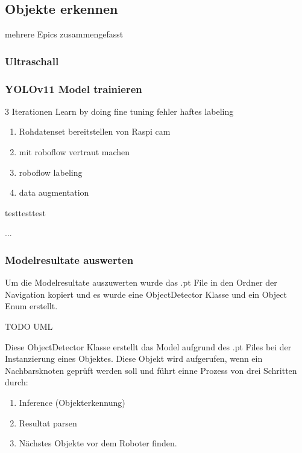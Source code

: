 
\subsection{Objekte erkennen}

mehrere Epics zusammengefasst 

\subsubsection{Ultraschall}

\subsubsection{YOLOv11 Model trainieren}
3 Iterationen
Learn by doing
fine tuning
fehler haftes labeling
\begin{enumerate}
    \item Rohdatenset bereitstellen von Raspi cam
    \item mit roboflow vertraut machen
    \item roboflow labeling
    \item data augmentation
\end{enumerate}
testtesttest

...

\subsubsection{Modelresultate auswerten}
\label{model-results}

Um die Modelresultate auszuwerten wurde das .pt File in den Ordner der Navigation kopiert und es wurde eine ObjectDetector Klasse und ein Object Enum erstellt.

TODO UML

Diese ObjectDetector Klasse erstellt das Model aufgrund des .pt Files bei der Instanzierung eines Objektes. Diese Objekt wird aufgerufen, wenn ein Nachbarsknoten geprüft werden soll und führt einne Prozess von drei Schritten durch:

\begin{enumerate}
    \item Inference (Objekterkennung)
    \item Resultat parsen
    \item Nächstes Objekte vor dem Roboter finden.
\end{enumerate}

